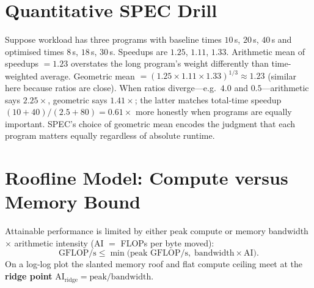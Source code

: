 \section{Quantitative SPEC Drill}
Suppose workload has three programs with baseline times $10$\,s, $20$\,s, $40$\,s and optimised times $8$\,s, $18$\,s, $30$\,s. Speedups are $1.25$, $1.11$, $1.33$. Arithmetic mean of speedups $=1.23$ overstates the long program's weight differently than time-weighted average. Geometric mean $=(1.25\times1.11\times1.33)^{1/3}\approx1.23$ (similar here because ratios are close). When ratios diverge---e.g.\ $4.0$ and $0.5$---arithmetic says $2.25\times$, geometric says $1.41\times$; the latter matches total-time speedup $(10+40)/(2.5+80)=0.61\times$ more honestly when programs are equally important. SPEC's choice of geometric mean encodes the judgment that each program matters equally regardless of absolute runtime.

\section{Roofline Model: Compute versus Memory Bound}
Attainable performance is limited by either peak compute or memory bandwidth $\times$ arithmetic intensity (AI $=$ FLOPs per byte moved):
\[ \text{GFLOP/s} \le \min\big(\text{peak GFLOP/s},\; \text{bandwidth}\times\text{AI}\big). \]
On a log-log plot the slanted memory roof and flat compute ceiling meet at the \textbf{ridge point} $\text{AI}_{\text{ridge}}=\text{peak}/\text{bandwidth}$.

\begin{center}
\end{center}

